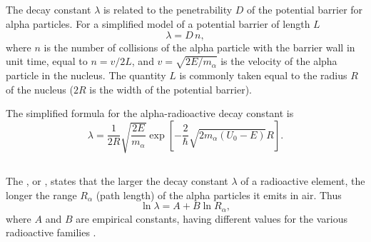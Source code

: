 \subsection{}\label{42.5.3} The decay constant $\lambda$  is related to the penetrability $D$ of the potential barrier for alpha particles. For a simplified
model of a potential barrier of length $L$ 
\begin{equation*}%
\lambda = D\,n,
\end{equation*}
where $n$ is the number of collisions of the alpha particle with the barrier wall in unit time, equal to $n = v/2L$, and $v = \sqrt{2E/m_{\alpha}}$ is the velocity of the alpha particle in the nucleus. The quantity $L$ is commonly taken equal to the radius $R$ of the nucleus ($2R$ is the width of the potential barrier).

The simplified formula for the alpha-radioactive decay constant is
\begin{equation*}%
\lambda = \frac{1}{2R}\sqrt{\frac{2E}{m_{\alpha}}}   \exp  \left[-\frac{2}{\hbar} \sqrt{2 m_{\alpha}(U_{0}-E)}R \right].
\end{equation*}

\subsection{}\label{42.5.4} The , or , states that the larger the decay constant $\lambda$ of a radioactive element, the longer the range $R_{\alpha}$ (path length) of the alpha particles it emits in air. Thus
\begin{equation*}%
\ln \lambda = A + B \ln R_{\alpha},
\end{equation*}
where $A$ and $B$ are empirical constants, having different values for the various radioactive families .

